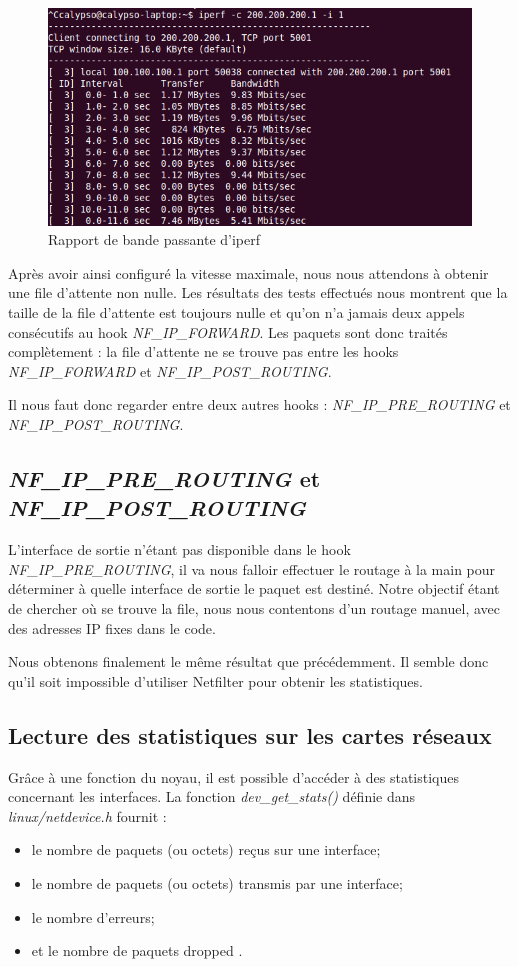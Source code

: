 \documentclass[a4paper]{article}
\begin{document}
\begin{figure}[!ht]
	\centering
	\includegraphics[scale=.5]{Capture-4.png}
	\caption{\label{iperfe} Rapport de bande passante d'iperf}
\end{figure}

Après avoir ainsi configuré la vitesse maximale,
nous nous attendons à obtenir une file d’attente non nulle.
Les résultats des tests effectués nous montrent que la taille
de la file d’attente est toujours nulle et qu'on n'a jamais
deux appels consécutifs au hook \textit{NF\_IP\_FORWARD}. 
Les paquets sont donc traités complètement : la file d'attente
ne se trouve pas entre les hooks
\textit{NF\_IP\_FORWARD} et \textit{NF\_IP\_POST\_ROUTING}.

Il nous faut donc regarder entre deux autres 
hooks : \textit{NF\_IP\_PRE\_ROUTING} et \textit{NF\_IP\_POST\_ROUTING}.

\subsection{\textit{NF\_IP\_PRE\_ROUTING} et \textit{NF\_IP\_POST\_ROUTING}}
L'interface de sortie n'étant pas disponible dans le hook \textit{NF\_IP\_PRE\_ROUTING},
il va nous falloir effectuer le routage à la main pour déterminer à quelle interface de sortie le paquet est destiné. Notre
objectif étant de chercher où se trouve la file, nous nous
contentons d'un routage manuel, avec des adresses IP fixes dans le code.

Nous obtenons finalement le même résultat que précédemment. 
Il semble donc qu'il soit impossible d'utiliser Netfilter pour
obtenir les statistiques. 

\subsection{Lecture des statistiques sur les cartes réseaux}
Grâce à une fonction du noyau, il est possible d’accéder à des
statistiques concernant les interfaces. La fonction \textit{dev\_get\_stats()}
définie dans \textit{linux/netdevice.h} fournit :
\begin{itemize}
	\item le nombre de paquets (ou octets) reçus sur une interface;
	\item le nombre de paquets (ou octets) transmis par une interface;
	\item le nombre d’erreurs;
	\item et le nombre de paquets \og dropped \fg.
\end{itemize}
\end{document}
